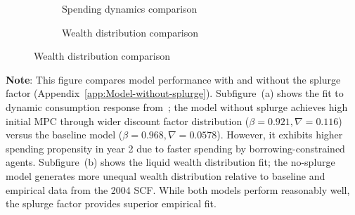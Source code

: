 \documentclass[\latexroot/\projectname]{subfiles}
\begin{document}
\begin{figure}[H]
  \centering
  \caption{\pregenmark Model performance with and without splurge factor}
  \whenintegrated{\label{fig:splurge0_Norwayestimation}} %
  \noindent\begin{minipage}{\textwidth}
    \centering
    \begin{subfigure}[b]{.5\linewidth}
      \centering
      \caption{Spending dynamics comparison}
      \whenintegrated{\label{fig:aggmpclotterywin_splurge0}} %
    \end{subfigure}
    \begin{subfigure}[b]{.5\linewidth}
      \centering
      \caption{Wealth distribution comparison}
      \whenintegrated{\label{fig:liquwealthdistribution_splurge0}} %
    \end{subfigure}
  \end{minipage}
\end{figure}
\noindent\parbox{\textwidth}{
  \medskip
  \footnotesize \textbf{Note}: This figure compares model performance with and without the splurge factor (Appendix~\ref{app:Model-without-splurge}).
  Subfigure~(a) shows the fit to dynamic consumption response from~\cite{fagereng-mpc-2021};
  the model without splurge achieves high initial MPC through wider discount factor distribution
  ($\beta = 0.921, \nabla = 0.116$) versus the baseline model ($\beta = 0.968, \nabla = 0.0578$).
  However, it exhibits higher spending propensity in year 2 due to faster spending by borrowing-constrained agents.
  Subfigure~(b) shows the liquid wealth distribution fit; the no-splurge model generates
  more unequal wealth distribution relative to baseline and empirical data from the 2004 SCF.
  While both models perform reasonably well, the splurge factor provides superior empirical fit.
}
\medskip\medskip

\smartbib
\end{document}
